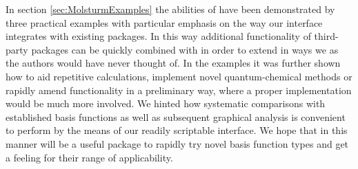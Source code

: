 In section \ref{sec:MolsturmExamples} the abilities of \molsturm
have been demonstrated
by three practical examples with particular emphasis
on the way our \python interface integrates with existing
\python packages.
In this way additional functionality of third-party packages can be quickly combined
with \molsturm in order to extend \molsturm in ways we as the authors
would have never thought of.
In the examples it was further shown how to aid repetitive calculations,
implement novel quantum-chemical methods
or rapidly amend functionality in a preliminary way,
where a proper implementation would be much more involved.
We hinted how
systematic comparisons with established basis functions
as well as subsequent graphical analysis
is convenient to perform by the means of our
readily scriptable interface.
We hope that in this manner \molsturm
will be a useful package to rapidly try novel basis function types
and get a feeling for their range of applicability.
